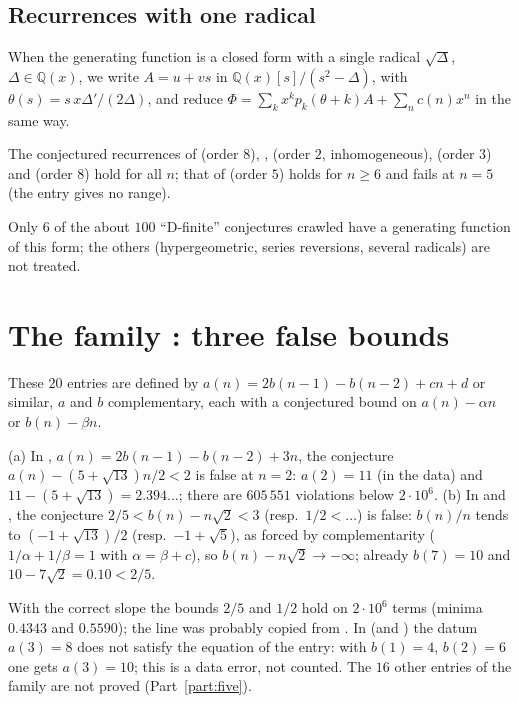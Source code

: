 \subsection{Recurrences with one radical}\label{s:dfinite}
When the generating function is a closed form with a single radical $\sqrt\Delta$, $\Delta\in\mathbb{Q}(x)$, we write
$A=u+vs$ in $\mathbb{Q}(x)[s]/(s^2-\Delta)$, with $\theta(s)=s\,x\Delta'/(2\Delta)$, and reduce
$\Phi=\sum_kx^kp_k(\theta+k)A+\sum_nc(n)x^n$ in the same way.
\begin{proposition} The conjectured recurrences of  (order $8$), ,  (order
$2$, inhomogeneous),  (order $3$) and  (order $8$) hold for all $n$; that of
 (order $5$) holds for $n\ge6$ and fails at $n=5$ (the entry gives no range).\end{proposition}
Only $6$ of the about $100$ ``D-finite'' conjectures crawled have a generating function of this form; the others
(hypergeometric, series reversions, several radicals) are not treated.

\section{The family : three false bounds}\label{s:beatty}
These $20$ entries are defined by $a(n)=2b(n-1)-b(n-2)+cn+d$ or similar, $a$ and $b$ complementary, each with a
conjectured bound on $a(n)-\alpha n$ or $b(n)-\beta n$.
\begin{proposition} (a) In , $a(n)=2b(n-1)-b(n-2)+3n$, the conjecture $a(n)-(5+\sqrt{13})n/2<2$ is false at
$n=2$: $a(2)=11$ (in the data) and $11-(5+\sqrt{13})=2.394\ldots$; there are $605\,551$ violations below $2\cdot10^6$.
(b) In  and , the conjecture $2/5<b(n)-n\sqrt2<3$ (resp.\ $1/2<\dots$) is false: $b(n)/n$
tends to $(-1+\sqrt{13})/2$ (resp.\ $-1+\sqrt5$), as forced by complementarity ($1/\alpha+1/\beta=1$ with $\alpha=\beta+c$),
so $b(n)-n\sqrt2\to-\infty$; already $b(7)=10$ and $10-7\sqrt2=0.10<2/5$.\end{proposition}
With the correct slope the bounds $2/5$ and $1/2$ hold on $2\cdot10^6$ terms (minima $0.4343$ and $0.5590$); the
line was probably copied from . In  (and ) the datum $a(3)=8$ does not satisfy
the equation of the entry: with $b(1)=4$, $b(2)=6$ one gets $a(3)=10$; this is a data error, not counted. The $16$
other entries of the family are not proved (Part~\ref{part:five}).
